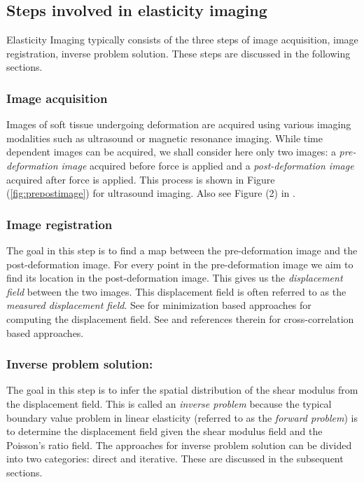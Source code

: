 \documentclass[12pt]{article}
\begin{document}
\subsection{Steps involved in elasticity imaging}
Elasticity Imaging typically consists of the three steps of image acquisition, image registration, inverse problem solution. These steps are discussed in the following sections.
\subsubsection{Image acquisition} Images of soft tissue undergoing deformation are acquired using various imaging modalities such as ultrasound or magnetic resonance imaging. While time dependent images can be acquired, we shall consider here only two images: a \textit{pre-deformation image} acquired before force is applied and a \textit{post-deformation image} acquired after force is applied. This process is shown in Figure (\ref{fig:prepostimage}) for ultrasound imaging. Also see Figure (2) in \cite{paper:konofagou2004}.
\subsubsection{Image registration} The goal in this step is to find a map between the pre-deformation image and the post-deformation image. For every point in the pre-deformation image we aim to find its location in the post-deformation image. This gives us the \textit{displacement field} between the two images. This displacement field is often referred to as the \textit{measured displacement field}. See \cite{paper:richards2009,paper:gokhale2004,paper:pellot-barakat2004} for minimization based approaches for computing the displacement field. See \cite{paper:ophir1991,paper:ophir1996,paper:alam1998} and references therein for cross-correlation based approaches.
\subsubsection{Inverse problem solution:} The goal in this step is to infer the spatial distribution of the shear modulus from the displacement field. This is called an \textit{inverse problem} because the typical boundary value problem in linear elasticity (referred to as the \textit{forward problem}) is to determine the displacement field given the shear modulus field and the Poisson's ratio field. The approaches for inverse problem solution can be divided into two categories: direct and iterative. These are discussed in the subsequent sections.
\end{document}
